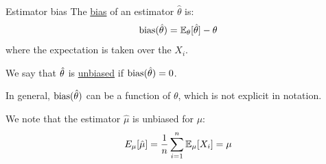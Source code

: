 \documentclass[../Main.tex]{subfiles}
\begin{document}
\begin{definition}{Estimator bias}
    The \underline{bias} of an estimator $\hat{\theta}$ is:
    \begin{equation*}
        \operatorname{bias}(\hat{\theta}) = \mathbb{E}_\theta[\hat{\theta}] -\theta
    \end{equation*}
    where the expectation is taken over the $X_i$.
    
    We say that $\hat{\theta}$ is \underline{unbiased} if $\operatorname{bias}(\hat{\theta}) = 0$.
\end{definition}
\begin{warning}
    In general, $\operatorname{bias}(\hat{\theta})$ can be a function of $\theta$, which is not explicit in notation.
\end{warning}
\begin{example}
    We note that the estimator $\hat{\mu}$ is unbiased for $\mu$:
    \begin{equation*}
        E_\mu[\hat{\mu}] = \frac1n \sum_{i=1}^{n} \mathbb{E}_\mu[X_i] = \mu
    \end{equation*}
\end{example}
\end{document}
